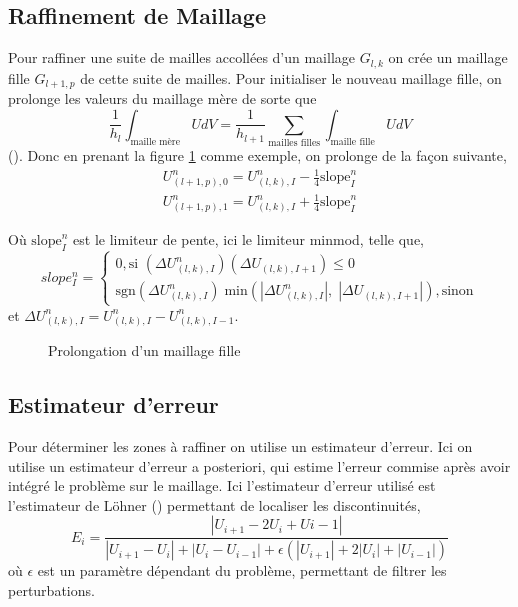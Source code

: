 \documentclass[12pt]{article}
\begin{document}
\subsection{Raffinement de Maillage}
Pour raffiner une suite de mailles accollées d'un maillage \(G_{l, k}\) on crée un maillage fille \(G_{l+1, p}\) de cette suite de mailles.
Pour initialiser le nouveau maillage fille, on prolonge les valeurs du maillage mère de sorte que \[\frac{1}{h_l} \int_{\text{maille mère}} U dV = \frac{1}{h_{l+1}}\sum_{\text{mailles filles}} \int_{\text{maille fille}} UdV\] (\cite{Berger_Oliger84}). Donc en prenant la figure \ref{grid_prolongation} comme exemple, on prolonge de la façon suivante, 
\begin{align*}
    U_{(l+1, p), 0}^n = U_{(l, k), I}^n - \frac{1}{4} \text{slope}_I^n\\
    U_{(l+1, p), 1}^n = U_{(l, k), I}^n + \frac{1}{4} \text{slope}_I^n
\end{align*}

Où \(\text{slope}_I^n \) est le limiteur de pente, ici le limiteur minmod, telle que, 
\[
    slope_I^n = 
    \begin{cases}
        0, \text{si } (\Delta U_{(l, k), I}^n) (\Delta U_{(l, k), I+1}) \leq 0 \\
        \text{sgn}(\Delta U_{(l, k), I}^n) \; \text{min}(|\Delta U_{(l, k), I}^n|, \; |\Delta U_{(l, k), I+1}|), \text{sinon}
    \end{cases}
\]
et \(\Delta U_{(l, k), I}^n = U_{(l, k), I}^n - U_{(l, k), I-1}^n\).


\begin{figure}[htbp]
    \centering
    
    \caption{Prolongation d'un maillage fille}
    \label{grid_prolongation}
\end{figure}

\subsection{Estimateur d'erreur}
Pour déterminer les zones à raffiner on utilise un estimateur d'erreur.
Ici on utilise un estimateur d'erreur a posteriori, qui estime l'erreur commise après avoir intégré le problème sur le maillage.
Ici l'estimateur d'erreur utilisé est l'estimateur de Löhner (\cite{Löhner86}) permettant de localiser les discontinuités, 
\[
    E_i = \frac{|U_{i+1} - 2 U_i + U{i-1}|}{|U_{i+1} - U_i| + |U_i - U_{i-1}| + \epsilon (|U_{i+1}| + 2|U_i| + |U_{i-1}|)}
\]
où \(\epsilon\) est un paramètre dépendant du problème, permettant de filtrer les perturbations. 
\end{document}
